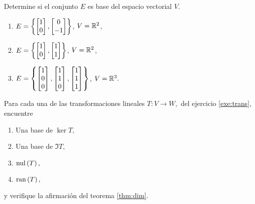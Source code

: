 \begin{resuelto}
 Determine si el conjunto $E$ es base del espacio vectorial $V.$
 \begin{enumerate}
  \item $E=\left\{ \begin{bmatrix}1\\0\end{bmatrix},\begin{bmatrix}0\\-1\end{bmatrix} \right\}$, $V=\mathbb{R}^{2}$,
  \item $E=\left\{ \begin{bmatrix}1\\0\end{bmatrix},\begin{bmatrix}1\\1\end{bmatrix} \right\}$, $V=\mathbb{R}^{2}$,
  \item $E=\left\{ \begin{bmatrix}1\\0\\0\end{bmatrix},\begin{bmatrix}1\\1\\0\end{bmatrix},\begin{bmatrix}1\\1\\1\end{bmatrix} \right\}$, $V=\mathbb{R}^{3}.$
 \end{enumerate}

\end{resuelto}


\begin{resuelto}
 Para cada una de las transformaciones lineales $T:V \to W,$ del ejercicio \ref{exe:trans}, encuentre
 \begin{enumerate}
  \item Una base de $\ker{T},$
  \item Una base de $\Im{T},$
  \item $\operatorname{nul}\left( T \right),$
  \item $\operatorname{ran}\left( T \right),$
\end{enumerate}
y verifique la afirmaci\'on del teorema \ref{thm:dim}.
\end{resuelto}







